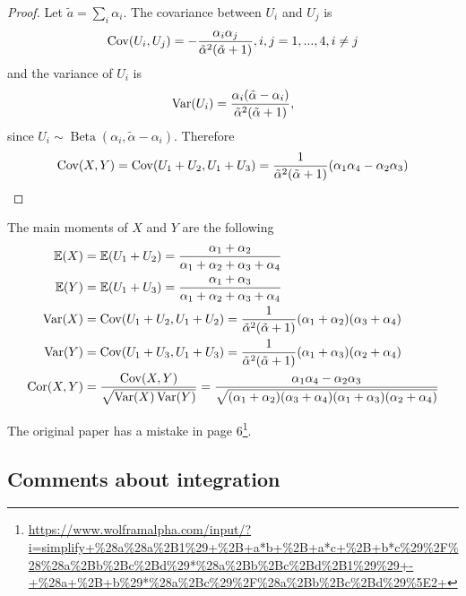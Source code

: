 \begin{proof}

  Let $\tilde{a} = \sum_i \alpha_i$. The covariance between $U_i$ and $U_j$ is \cite[]{lin2016dirichlet} 
\begin{equation}
  \operatorname{Cov}(U_i, U_j) = - \frac{\alpha_i\alpha_j}{\tilde{\alpha}^2(\tilde{\alpha}+1)}, i,j = 1,...,4, i \neq j
\end{equation} 
and the variance of $U_i$ is 
\begin{equation}
  \operatorname{Var}(U_i) = \frac{\alpha_i(\tilde{\alpha}-\alpha_i)}{\tilde{\alpha}^2(\tilde{\alpha}+1)},
\end{equation}
since $U_i \sim \operatorname{Beta}(\alpha_i, \tilde{\alpha} -\alpha_i)$.
Therefore 
\begin{equation}
  \operatorname{Cov}(X,Y) = \operatorname{Cov}(U_1+U_2, U_1+U_3) = \frac{1}{\tilde{\alpha}^2(\tilde{\alpha}+1)}(\alpha_1\alpha_4 - \alpha_2\alpha_3)
\end{equation}
  
\end{proof}

The main moments of $X$ and $Y$ are the following 
\begin{align*}
    \mathbb{E}(X) &= \mathbb{E}(U_1 + U_2) = \frac{\alpha_1+\alpha_2}{\alpha_1+\alpha_2+\alpha_3+\alpha_4} \\
    \mathbb{E}(Y) &= \mathbb{E}(U_1 + U_3) = \frac{\alpha_1+\alpha_3}{\alpha_1+\alpha_2+\alpha_3+\alpha_4} \\
    \operatorname{Var}(X) &= \operatorname{Cov}(U_1+U_2, U_1+U_2) = \frac{1}{\tilde{\alpha}^2(\tilde{\alpha}+1)}(\alpha_1+\alpha_2)(\alpha_3 + \alpha_4) \\
    \operatorname{Var}(Y) &= \operatorname{Cov}(U_1+U_3, U_1+U_3) = \frac{1}{\tilde{\alpha}^2(\tilde{\alpha}+1)}(\alpha_1+\alpha_3)(\alpha_2 + \alpha_4)  \\  
    \operatorname{Cor}(X,Y) &= \frac{\operatorname{Cov}(X,Y)}{\sqrt{\operatorname{Var}(X)\operatorname{Var}(Y)}} = \frac{\alpha_1\alpha_4 - \alpha_2\alpha_3}{\sqrt{(\alpha_1+\alpha_2)(\alpha_3+\alpha_4)(\alpha_1+\alpha_3)(\alpha_2+\alpha_4)}}
\end{align*}

The original paper has a mistake in page
6\footnote{\url{https://www.wolframalpha.com/input/?i=simplify+\%28a\%28a\%2B1\%29+\%2B+a*b+\%2B+a*c+\%2B+b*c\%29\%2F\%28\%28a\%2Bb\%2Bc\%2Bd\%29*\%28a\%2Bb\%2Bc\%2Bd\%2B1\%29\%29+-+\%28a+\%2B+b\%29*\%28a\%2Bc\%29\%2F\%28a\%2Bb\%2Bc\%2Bd\%29\%5E2+}}.

\subsection{Comments about integration}


